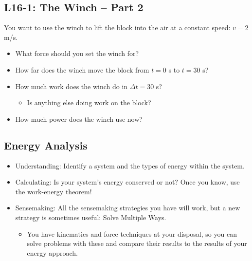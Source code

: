 \documentclass[]{article}
\newcommand{\Week}{16}
\begin{document}
\begin{PresentSpace}
\vspace{-10pt}
\section*{L\Week-1: The Winch -- Part 2}
\vspace{-10pt}
You want to use the winch to lift the block into the air at a constant speed: $v=2$ m/s.
\begin{itemize}
	\item What force should you set the winch for?
	\item How far does the winch move the block from $t=0$ s to $t=30$ s?
	\item How much work does the winch do in $\Delta t = 30$ s?
	\begin{itemize}
		\item Is anything else doing work on the block?
	\end{itemize}
	\item How much power does the winch use now?
\end{itemize}
\end{PresentSpace}
\newpage
\begin{TeacherMargin}

\end{TeacherMargin}
\begin{PresentSpace}
\vspace{-10pt}
\section*{Energy Analysis}
\vspace{-10pt}
\begin{itemize}
	\item Understanding: Identify a system and the types of energy within the system.
	\item Calculating: Is your system's energy conserved or not? Once you know, use the work-energy theorem!
	\item Sensemaking: All the sensemaking strategies you have will work, but a new strategy is sometimes useful: Solve Multiple Ways.
	\begin{itemize}
		\item You have kinematics and force techniques at your disposal, so you can solve problems with these and compare their results to the results of your energy approach.
	\end{itemize}
\end{itemize}
\end{PresentSpace}
\end{document}
